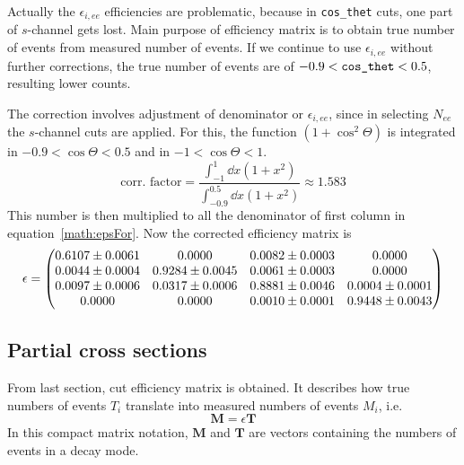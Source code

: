Actually the $\epsilon_{i, ee}$ efficiencies are problematic, because in \verb|cos_thet| cuts, one part of $s$-channel gets lost. Main purpose of efficiency matrix is to obtain true number of events from measured number of events. If we continue to use $\epsilon_{i, ee}$ without further corrections, the true number of events are of $-0.9 < \verb|cos_thet| < 0.5$, resulting lower counts. 

The correction involves adjustment of denominator or $\epsilon_{i, ee}$, since in selecting $N_{ee}$ the $s$-channel cuts are applied. For this, the function $(1+\cos^2\Theta)$ is integrated in $-0.9 < \cos\Theta < 0.5 $  and in $-1 < \cos\Theta < 1$.
\begin{equation}
	\text{corr. factor} = \frac{\int_{-1}^{1} \dd{x} (1+x^2)}{ \int_{-0.9}^{0.5}\dd{x} (1+x^2)} \approx \num{1.583}
\end{equation}
This number is then multiplied to all the denominator of first column in equation~\ref{math:epsFor}. Now the corrected efficiency matrix is
\begin{equation}
	\epsilon = \begin{pmatrix} \num{0.6107 +- 0.0061} & \num{0.0000 +- 0.0000} & \num{0.0082 +- 0.0003} & \num{0.0000 +- 0.0000} \\ 
								\num{0.0044 +- 0.0004} & \num{0.9284 +- 0.0045} & \num{0.0061 +- 0.0003} & \num{0.0000 +- 0.0000} \\
								\num{0.0097 +- 0.0006} & \num{0.0317 +- 0.0006} & \num{0.8881 +- 0.0046} & \num{0.0004 +- 0.0001} \\
								\num{0.0000 +- 0.0000} & \num{0.0000 +- 0.0000} & \num{0.0010 +- 0.0001} & \num{0.9448 +- 0.0043} 
	\end{pmatrix}
\end{equation}





\subsection{Partial cross sections}
From last section, cut efficiency matrix is obtained. It describes how true numbers of events $T_i$ translate into measured numbers of events $M_i$, i.e.
\begin{equation}
	\mathbf{M} = \epsilon \mathbf{T}
\end{equation}
In this compact matrix notation, $\mathbf{M}$ and $\mathbf{T}$ are vectors containing the numbers of events in a decay mode.

